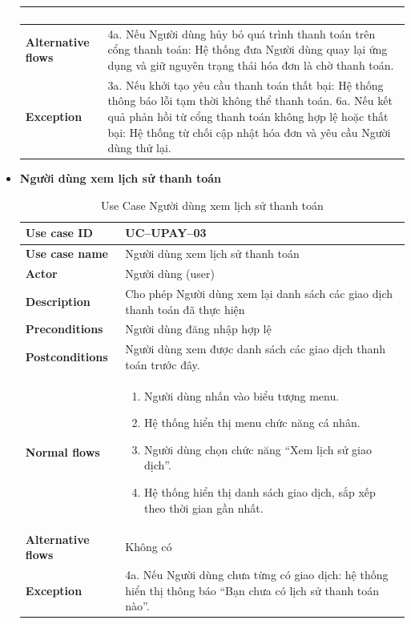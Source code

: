 \begin{itemize}
\begin{longtable}{|m{}|m{}|}
\begin{enumerate}[label=\arabic*.]
  \end{enumerate}\\
  \hline
  \textbf{Alternative flows} &
  4a. Nếu Người dùng hủy bỏ quá trình thanh toán trên cổng thanh toán: Hệ thống đưa Người dùng quay lại ứng dụng và giữ nguyên trạng thái hóa đơn là chờ thanh toán.\\
  \hline
  \textbf{Exception} &
  3a. Nếu khởi tạo yêu cầu thanh toán thất bại: Hệ thống thông báo lỗi tạm thời không thể thanh toán. \newline
  6a. Nếu kết quả phản hồi từ cổng thanh toán không hợp lệ hoặc thất bại: Hệ thống từ chối cập nhật hóa đơn và yêu cầu Người dùng thử lại.\\
  \hline
  \end{longtable}

\item \textbf{Người dùng xem lịch sử thanh toán}
\begin{longtable}{|m{}|m{}|}
          \caption{Use Case Người dùng xem lịch sử thanh toán} \\
  \hline
  \textbf{Use case ID} & UC--UPAY--03 \\
  \hline
  \textbf{Use case name} & Người dùng xem lịch sử thanh toán \\
  \hline
  \textbf{Actor} & Người dùng (user) \\
  \hline
  \textbf{Description} & Cho phép Người dùng xem lại danh sách các giao dịch thanh toán đã thực hiện \\
  \hline
  \textbf{Preconditions} & Người dùng đăng nhập hợp lệ \\
  \hline
  \textbf{Postconditions} & Người dùng xem được danh sách các giao dịch thanh toán trước đây. \\
  \hline
  \textbf{Normal flows} &
  \begin{enumerate}[label=\arabic*.]
    \item Người dùng nhấn vào biểu tượng menu.
    \item Hệ thống hiển thị menu chức năng cá nhân.
    \item Người dùng chọn chức năng “Xem lịch sử giao dịch”.
    \item Hệ thống hiển thị danh sách giao dịch, sắp xếp theo thời gian gần nhất.
  \end{enumerate}\\
  \hline
  \textbf{Alternative flows} & Không có\\
  \hline
  \textbf{Exception} &
  4a. Nếu Người dùng chưa từng có giao dịch: hệ thống hiển thị thông báo “Bạn chưa có lịch sử thanh toán nào”.\\
  \hline
  \end{longtable}


\end{itemize}
